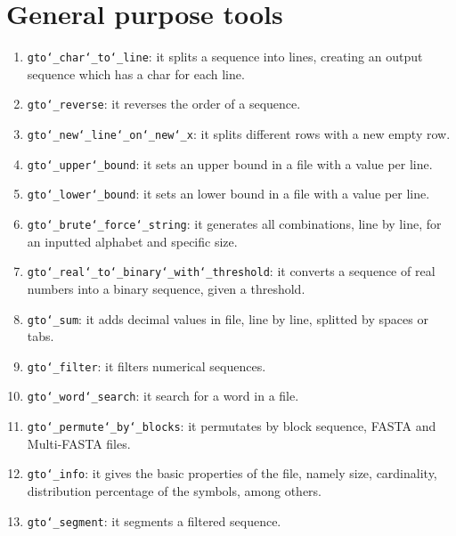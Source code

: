 \chapter{General purpose tools}
\label{seq}

\begin{enumerate}

\item \texttt{gto\char`_char\char`_to\char`_line}: it splits a sequence into lines, creating an output sequence which has a char for each line.

\item \texttt{gto\char`_reverse}: it reverses the order of a sequence.

\item \texttt{gto\char`_new\char`_line\char`_on\char`_new\char`_x}: it splits different rows with a new empty row.

\item \texttt{gto\char`_upper\char`_bound}: it sets an upper bound in a file with a value per line.

\item \texttt{gto\char`_lower\char`_bound}: it sets an lower bound in a file with a value per line.

\item \texttt{gto\char`_brute\char`_force\char`_string}: it generates all combinations, line by line, for an inputted alphabet and specific size.

\item \texttt{gto\char`_real\char`_to\char`_binary\char`_with\char`_threshold}: it converts a sequence of real numbers into a binary sequence, given a threshold.

\item \texttt{gto\char`_sum}: it adds decimal values in file, line by line, splitted by spaces or tabs.

\item \texttt{gto\char`_filter}: it filters numerical sequences.

\item \texttt{gto\char`_word\char`_search}: it search for a word in a file.

\item \texttt{gto\char`_permute\char`_by\char`_blocks}: it permutates by block sequence, FASTA and Multi-FASTA files. 

\item \texttt{gto\char`_info}: it gives the basic properties of the file, namely size, cardinality, distribution percentage of the symbols, among others.

\item \texttt{gto\char`_segment}: it segments a filtered sequence.

\end{enumerate}


